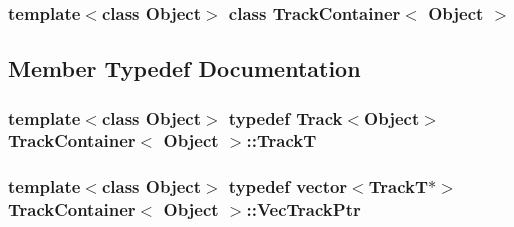 \subsubsection*{template$<$class \-Object$>$ class Track\-Container$<$ Object $>$}



\subsection{\-Member \-Typedef \-Documentation}
\hypertarget{class_track_container_a444451c20696d1cd624f85404c9b5219}{
\subsubsection[{\-Track\-T}]{\setlength{\rightskip}{0pt plus 5cm}template$<$class \-Object$>$ typedef {\bf \-Track}$<$\-Object$>$ {\bf \-Track\-Container}$<$ \-Object $>$\-::{\bf \-Track\-T}}}\label{class_track_container_a444451c20696d1cd624f85404c9b5219}
\hypertarget{class_track_container_a44996c9863d05fe83d9e231f3fd8c1a5}{
\subsubsection[{\-Vec\-Track\-Ptr}]{\setlength{\rightskip}{0pt plus 5cm}template$<$class \-Object$>$ typedef vector$<${\bf \-Track\-T}$\ast$$>$ {\bf \-Track\-Container}$<$ \-Object $>$\-::{\bf \-Vec\-Track\-Ptr}}}\label{class_track_container_a44996c9863d05fe83d9e231f3fd8c1a5}


